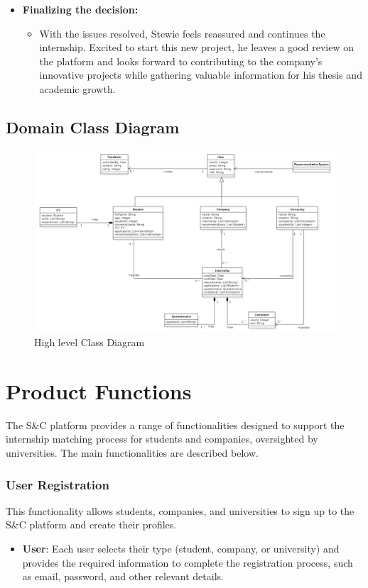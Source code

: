 \begin{itemize}[leftmargin=*, label={}]
    \item \textbf{Finalizing the decision:}
    \begin{itemize}
        \item With the issues resolved, Stewie feels reassured and continues the internship. Excited to start this new project, he leaves a good review on the platform and looks forward to contributing to the company’s innovative projects while gathering valuable information for his thesis and academic growth.
    \end{itemize}
\end{itemize}


\subsection{Domain Class Diagram}

\begin{figure} [H]
    \centering
    \includegraphics[width=1\linewidth]{Images/domain_class_diagram.png}
    \caption{High level Class Diagram}
    \label{fig: High level Class Diagram}
\end{figure}

\section{Product Functions}

The S\&C platform provides a range of functionalities designed to support the internship matching process for students and companies, oversighted by universities. The main functionalities are described below.

\subsubsection*{User Registration} 
This functionality allows students, companies, and universities to sign up to the S\&C platform and create their profiles.
\begin{itemize}
    \item \textbf{User}: Each user selects their type (student, company, or university) and provides the required information to complete the registration process, such as email, password, and other relevant details.
\end{itemize}

